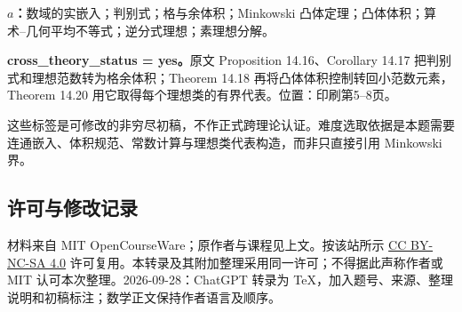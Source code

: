 \documentclass[UTF8,11pt]{ctexart}
\begin{document}
\textbf{$a$：}数域的实嵌入；判别式；格与余体积；Minkowski 凸体定理；凸体体积；算术--几何平均不等式；逆分式理想；素理想分解。

\textbf{cross\_theory\_status = yes。}原文 Proposition 14.16、Corollary 14.17 把判别式和理想范数转为格余体积；Theorem 14.18 再将凸体体积控制转回小范数元素，Theorem 14.20 用它取得每个理想类的有界代表。位置：印刷第5--8页。

这些标签是可修改的非穷尽初稿，不作正式跨理论认证。难度选取依据是本题需要连通嵌入、体积规范、常数计算与理想类代表构造，而非只直接引用 Minkowski 界。
\subsection*{许可与修改记录}
材料来自 MIT OpenCourseWare；原作者与课程见上文。按该站所示 \href{https://creativecommons.org/licenses/by-nc-sa/4.0/}{CC BY-NC-SA 4.0} 许可复用。本转录及其附加整理采用同一许可；不得据此声称作者或 MIT 认可本次整理。2026-09-28：ChatGPT 转录为 TeX，加入题号、来源、整理说明和初稿标注；数学正文保持作者语言及顺序。
\end{document}
